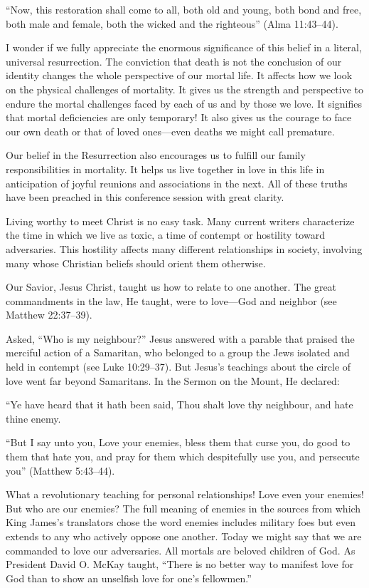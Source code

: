 \documentclass[letterpaper, 11pt]{report}
\newcommand{\intalkheader}[1]{
    \vspace{0.75em}
    \noindent{\normalsize\bfseries #1}
    \par\nopagebreak %
    \vspace{0.25em}
    \nopagebreak     %
}
\begin{document}
“Now, this restoration shall come to all, both old and young, both bond and free, both male and female, both the wicked and the righteous” (Alma 11:43–44).

I wonder if we fully appreciate the enormous significance of this belief in a literal, universal resurrection. The conviction that death is not the conclusion of our identity changes the whole perspective of our mortal life. It affects how we look on the physical challenges of mortality. It gives us the strength and perspective to endure the mortal challenges faced by each of us and by those we love. It signifies that mortal deficiencies are only temporary! It also gives us the courage to face our own death or that of loved ones—even deaths we might call premature.

Our belief in the Resurrection also encourages us to fulfill our family responsibilities in mortality. It helps us live together in love in this life in anticipation of joyful reunions and associations in the next. All of these truths have been preached in this conference session with great clarity.

\intalkheader{II.}

Living worthy to meet Christ is no easy task. Many current writers characterize the time in which we live as toxic, a time of contempt or hostility toward adversaries. This hostility affects many different relationships in society, involving many whose Christian beliefs should orient them otherwise.

Our Savior, Jesus Christ, taught us how to relate to one another. The great commandments in the law, He taught, were to love—God and neighbor (see Matthew 22:37–39).

Asked, “Who is my neighbour?” Jesus answered with a parable that praised the merciful action of a Samaritan, who belonged to a group the Jews isolated and held in contempt (see Luke 10:29–37). But Jesus’s teachings about the circle of love went far beyond Samaritans. In the Sermon on the Mount, He declared:

“Ye have heard that it hath been said, Thou shalt love thy neighbour, and hate thine enemy.

“But I say unto you, Love your enemies, bless them that curse you, do good to them that hate you, and pray for them which despitefully use you, and persecute you” (Matthew 5:43–44).

What a revolutionary teaching for personal relationships! Love even your enemies! But who are our enemies? The full meaning of enemies in the sources from which King James’s translators chose the word enemies includes military foes but even extends to any who actively oppose one another. Today we might say that we are commanded to love our adversaries. All mortals are beloved children of God. As President David O. McKay taught, “There is no better way to manifest love for God than to show an unselfish love for one’s fellowmen.”
\end{document}

